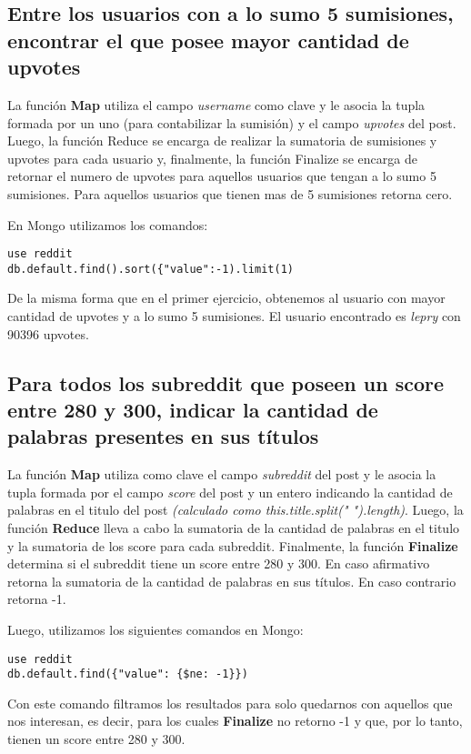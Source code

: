 \subsection{Entre los usuarios con a lo sumo 5 sumisiones, encontrar el que posee mayor cantidad de upvotes}

La función \textbf{Map} utiliza el campo \textit{username} como clave y le asocia la tupla formada por un uno (para contabilizar la sumisión) y el campo \textit{upvotes} del post.
Luego, la función Reduce se encarga de realizar la sumatoria de sumisiones y upvotes para cada usuario y, finalmente, la función Finalize se encarga de retornar el numero de upvotes para aquellos usuarios que tengan a lo sumo 5 sumisiones. Para aquellos usuarios que tienen mas de 5 sumisiones retorna cero.

En Mongo utilizamos los comandos:
\begin{lstlisting}
use reddit
db.default.find().sort({"value":-1).limit(1)
\end{lstlisting}

De la misma forma que en el primer ejercicio, obtenemos al usuario con mayor cantidad de upvotes y a lo sumo 5 sumisiones. El usuario encontrado es \textit{lepry} con 90396 upvotes.


\subsection{Para todos los subreddit que poseen un score entre 280 y 300, indicar la cantidad de palabras presentes en sus títulos}

La función \textbf{Map} utiliza como clave el campo \textit{subreddit} del post y le asocia la tupla formada por el campo \textit{score} del post y un entero indicando la cantidad de palabras en el titulo del post \textit{(calculado como this.title.split(" ").length)}.
Luego, la función \textbf{Reduce} lleva a cabo la sumatoria de la cantidad de palabras en el titulo y la sumatoria de los score para cada subreddit.
Finalmente, la función \textbf{Finalize} determina si el subreddit tiene un score entre 280 y 300. En caso afirmativo retorna la sumatoria de la cantidad de palabras en sus títulos. En caso contrario retorna -1.

Luego, utilizamos los siguientes comandos en Mongo:
\begin{lstlisting}
use reddit
db.default.find({"value": {$ne: -1}})
\end{lstlisting}

Con este comando filtramos los resultados para solo quedarnos con aquellos que nos interesan, es decir, para los cuales \textbf{Finalize} no retorno -1 y que, por lo tanto, tienen un score entre 280 y 300.

